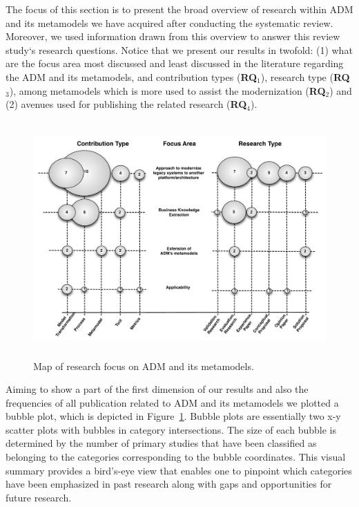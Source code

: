 

The focus of this section is to present the broad overview of research within ADM and its metamodels we have acquired after conducting the systematic review. Moreover, we used information drawn from this overview to answer this review study`s research questions. Notice that we present our results in twofold: (1) what are the focus area most discussed and least discussed in the literature regarding the ADM and its metamodels, and contribution types (\textbf{RQ$_1$}), research type (\textbf{RQ$_3$}), among metamodels which is more used to assist the modernization (\textbf{RQ$_2$}) and (2) avenues used for publishing the related research (\textbf{RQ$_4$}).

\begin{figure}[t]
\centering
  \includegraphics[width=16cm, height=9cm]{figuras/MapaNOVO3}
\caption{Map of research focus on ADM and its metamodels.}
\label{map}
\end{figure} 




Aiming to show a part of the first dimension of our results and also the frequencies of all publication related to ADM and its metamodels we plotted a bubble plot, which is depicted in Figure~\ref{map}. Bubble plots are essentially two x-y scatter plots with bubbles in category intersections. The size of each bubble is determined by the number of primary studies that have been classified as belonging to the categories corresponding to the bubble coordinates. This visual summary provides a bird's-eye view that enables one to pinpoint which categories have been emphasized in past research along with gaps and opportunities for future research.

